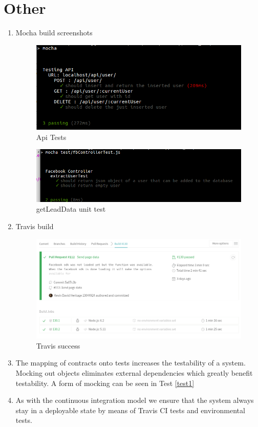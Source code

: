 \documentclass{article}
\begin{document}
\section{Other}
\begin{enumerate}
	\item Mocha build screenshots 
	\begin{figure}[H]
	\includegraphics[width=15cm]{images/tests.png}
	\caption{Api Tests}
	\end{figure}
	
	\begin{figure}[H]
		\includegraphics[width=15cm]{images/FbControllerTest.png}
		\caption{getLeadData unit test}
	\end{figure}
	\clearpage
	\item Travis build
	\begin{figure}[H]
	\includegraphics[width=15cm]{images/Travis.png}
	\caption{Travis success }
	\end{figure}	
	
	\item The mapping of contracts onto tests increases the testability of a system. Mocking out objects eliminates external dependencies which greatly benefit testability. A form of mocking can be seen in Test \ref{test1}
	\item As with the continuous integration model we ensure that the system always stay in a deployable state by means of Travis CI tests and environmental tests.
\end{enumerate}
\end{document}
